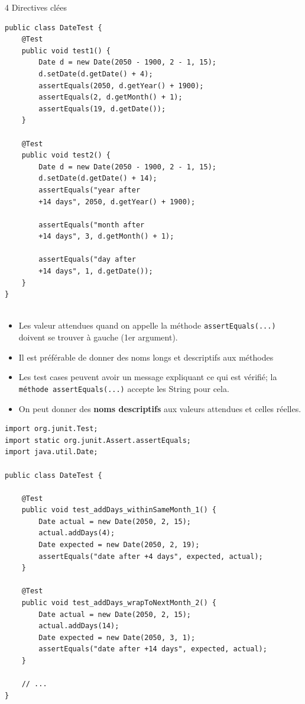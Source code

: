 \documentclass[16pt]{report}
\begin{document}
\begin{multicols*}{2}
\begin{EExample}{4 Directives clées}{}
\begin{lstlisting}[style=JavaDraculaWhite]
public class DateTest {
    @Test
    public void test1() {
        Date d = new Date(2050 - 1900, 2 - 1, 15);
        d.setDate(d.getDate() + 4); 
        assertEquals(2050, d.getYear() + 1900); 
        assertEquals(2, d.getMonth() + 1); 
        assertEquals(19, d.getDate()); 
    }

    @Test
    public void test2() {
        Date d = new Date(2050 - 1900, 2 - 1, 15);
        d.setDate(d.getDate() + 14); 
        assertEquals("year after 
        +14 days", 2050, d.getYear() + 1900);

        assertEquals("month after 
        +14 days", 3, d.getMonth() + 1);

        assertEquals("day after 
        +14 days", 1, d.getDate());
    }
}
    
\end{lstlisting} 
    \begin{itemize}
        \item Les \textcolor{myb}{valeur attendues} quand on appelle la méthode \texttt{assertEquals(...)}
            doivent se trouver à gauche (1er argument). 
        \item Il est préférable de donner des noms longs et descriptifs aux méthodes 
        \item Les test cases peuvent avoir un message expliquant ce qui est vérifié; la 
            \texttt{méthode assertEquals(...)} accepte les String pour cela. 
        \item On peut donner des \textbf{noms descriptifs} aux valeurs attendues et celles réelles.   
    \end{itemize}       

\begin{lstlisting}[style=JavaDraculaWhite]
import org.junit.Test;
import static org.junit.Assert.assertEquals;
import java.util.Date;

public class DateTest {

    @Test
    public void test_addDays_withinSameMonth_1() {
        Date actual = new Date(2050, 2, 15);
        actual.addDays(4); 
        Date expected = new Date(2050, 2, 19);
        assertEquals("date after +4 days", expected, actual);
    }

    @Test
    public void test_addDays_wrapToNextMonth_2() {
        Date actual = new Date(2050, 2, 15);
        actual.addDays(14); 
        Date expected = new Date(2050, 3, 1);
        assertEquals("date after +14 days", expected, actual);
    }

    // ...
}


\end{lstlisting}
\end{EExample}
\end{multicols*}
\end{document}

